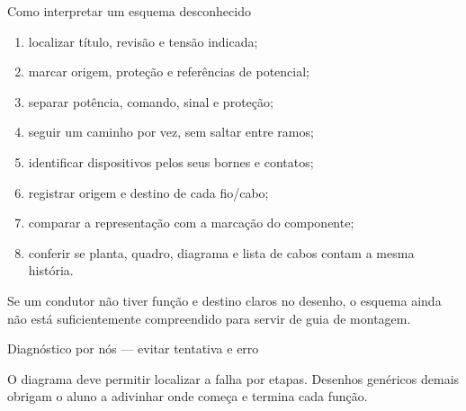 \begin{frame}{Como interpretar um esquema desconhecido}
\small
\begin{enumerate}
\item localizar título, revisão e tensão indicada;
\item marcar origem, proteção e referências de potencial;
\item separar potência, comando, sinal e proteção;
\item seguir um caminho por vez, sem saltar entre ramos;
\item identificar dispositivos pelos seus bornes e contatos;
\item registrar origem e destino de cada fio/cabo;
\item comparar a representação com a marcação do componente;
\item conferir se planta, quadro, diagrama e lista de cabos contam a mesma história.
\end{enumerate}
\begin{caixaAt}
Se um condutor não tiver função e destino claros no desenho, o esquema ainda não está suficientemente compreendido para servir de guia de montagem.
\end{caixaAt}
\end{frame}

\begin{frame}{Diagnóstico por nós — evitar tentativa e erro}
\centering
{}
\vspace{2mm}
\begin{caixaObs}
O diagrama deve permitir localizar a falha por etapas. Desenhos genéricos demais obrigam o aluno a adivinhar onde começa e termina cada função.
\end{caixaObs}
\end{frame}
